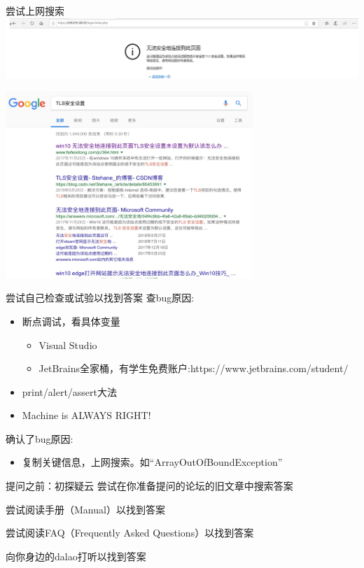 \documentclass[10pt]{beamer}
\begin{document}
\begin{frame}[fragile]{尝试上网搜索}
    \includegraphics[width=\textwidth]{pic/error-1.png}

    \includegraphics[width=0.7\textwidth]{pic/sol-1.png}
\end{frame}

\begin{frame}[fragile]{尝试自己检查或试验以找到答案}
    查bug原因:
    \begin{itemize}
        \item 断点调试，看具体变量
              \begin{itemize}
                  \item Visual Studio
                  \item JetBrains全家桶，有学生免费账户:https://www.jetbrains.com/student/
              \end{itemize}
        \item print/alert/assert大法
        \item Machine is ALWAYS RIGHT!
    \end{itemize}
    确认了bug原因:
    \begin{itemize}
        \item 复制关键信息，上网搜索。如“ArrayOutOfBoundException”
    \end{itemize}
\end{frame}

\begin{frame}[fragile]{提问之前：初探疑云}
    尝试在你准备提问的论坛的旧文章中搜索答案

    尝试阅读手册（Manual）以找到答案

    尝试阅读FAQ（Frequently Asked Questions）以找到答案

    向你身边的dalao打听以找到答案
\end{frame}
\end{document}
